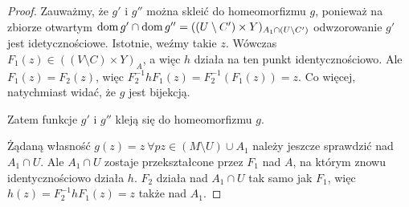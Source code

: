 \begin{lem}
\begin{proof}
    Zauważmy, że $g'$ i $g''$ można skleić do homeomorfizmu $g$, ponieważ na zbiorze otwartym $\operatorname{dom} g'\cap \operatorname{dom} g'' = ((U\setminus C')\times Y)_{A_1 \cap (U\setminus C')}$ odwzorowanie $g'$ jest idetycznościowe. Istotnie, weźmy takie $z$. Wówczas $F_1(z) \in ((V\setminus C) \times Y)_{A}$, a więc $h$ działa na ten punkt identycznościowo. Ale $F_1(z) = F_2(z)$, więc $F_2^{-1} h F_1(z) = F_2^{-1}(F_1(z)) = z$. Co więcej, natychmiast widać, że $g$ jest bijekcją.
    
    Zatem funkcje $g'$ i $g''$ kleją się do homeomorfizmu $g$.
    
    Żądaną własność $g(z) = z\ \forall pz \in (M\setminus U) \cup A_1$ należy jeszcze sprawdzić nad $A_1\cap U$. Ale $A_1\cap U$ zostaje przekształcone przez $F_1$ nad $A$, na którym znowu identycznościowo działa $h$. $F_2$ działa nad $A_1 \cap U$ tak samo jak $F_1$, więc $h(z) = F_2^{-1}hF_1(z) = z$ także nad $A_1$.
  \end{proof}
\end{lem}

